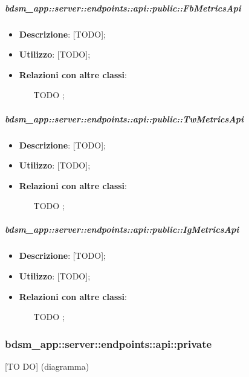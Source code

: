     \subparagraph{bdsm\_app::server::endpoints::api::public::FbMetricsApi} %
    \label{subp:bdsm_app_server_endpoints_api_public_fbmetricsapi}
    \begin{itemize}
      \item \textbf{Descrizione}: [TODO];
      \item \textbf{Utilizzo}: [TODO];
      \item \textbf{Relazioni con altre classi}:
        \begin{itemize}
          \item [TODO];
        \end{itemize}
      \end{itemize}
    
    \subparagraph{bdsm\_app::server::endpoints::api::public::TwMetricsApi} %
    \label{subp:bdsm_app_server_endpoints_api_public_twmetricsapi}
    \begin{itemize}
      \item \textbf{Descrizione}: [TODO];
      \item \textbf{Utilizzo}: [TODO];
      \item \textbf{Relazioni con altre classi}:
        \begin{itemize}
          \item [TODO];
        \end{itemize}
      \end{itemize}
    
    \subparagraph{bdsm\_app::server::endpoints::api::public::IgMetricsApi} %
    \label{subp:bdsm_app_server_endpoints_api_public_igmetricsapi}
    \begin{itemize}
      \item \textbf{Descrizione}: [TODO];
      \item \textbf{Utilizzo}: [TODO];
      \item \textbf{Relazioni con altre classi}:
        \begin{itemize}
          \item [TODO];
        \end{itemize}
      \end{itemize}

\subsubsection{bdsm\_app::server::endpoints::api::private} %
\label{ssub:bdsm_app_server_endpoints_api_private}
[TO DO] (diagramma) \newline \newline

